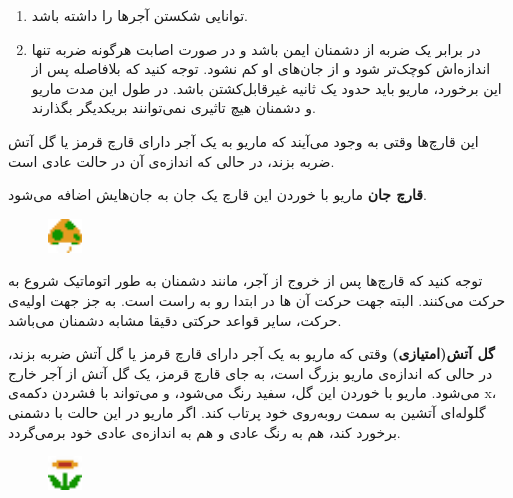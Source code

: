 \documentclass{utap}
\begin{document}
\begin{itemize}
		\begin{enumerate}
			\item
توانایی شکستن آجر‌ها را داشته باشد.
			\item
در برابر یک ضربه از دشمنان ایمن باشد و در صورت اصابت هرگونه ضربه تنها اندازه‌اش کوچک‌تر شود و از جان‌های او کم نشود. توجه کنید که بلافاصله پس از این برخورد، ماریو باید حدود یک ثانیه غیرقابل‌کشتن باشد. در طول این مدت ماریو و دشمنان هیچ تاثیری نمی‌توانند بر‌یکدیگر بگذارند.
		\end{enumerate}
		این قارچ‌ها وقتی به وجود می‌آیند که ماریو به یک آجر دارای قارچ قرمز یا گل آتش ضربه بزند، در حالی که اندازه‌ی آن در حالت عادی است.
		\newline
	\begin{minipage}{.75\textwidth}
		\item
\textbf{قارچ جان}
ماریو با خوردن این قارچ یک جان به جان‌هایش اضافه می‌شود.
\end{minipage}
\begin{minipage}{.15\textwidth}
\begin{figure}[H]
	\begin{center}
		\includegraphics[width=0.9cm]{health}
	\end{center}
\end{figure}
\end{minipage}

توجه کنید که قارچ‌ها پس از خروج از آجر، مانند دشمنان به طور اتوماتیک شروع به حرکت می‌کنند. البته جهت حرکت آن ها در ابتدا رو به راست است. به جز جهت اولیه‌ی حرکت، سایر قواعد حرکتی دقیقا مشابه دشمنان می‌باشد.\newline
	
	\begin{minipage}{.75\textwidth}
		\item
		\textbf{گل آتش(امتیازی)}
		وقتی که ماریو به یک آجر دارای قارچ قرمز یا گل آتش ضربه بزند، در حالی که اندازه‌ی ماریو بزرگ است، به جای قارچ قرمز، یک گل آتش از آجر خارج می‌شود. ماریو با خوردن این گل، سفید رنگ می‌شود، و می‌تواند با فشردن دکمه‌ی x، گلوله‌ای آتشین به سمت روبه‌روی خود پرتاب کند. اگر ماریو در این حالت با دشمنی برخورد کند، هم به رنگ عادی و هم به اندازه‌ی عادی خود برمی‌گردد.
	\end{minipage}
	\begin{minipage}{.15\textwidth}
		\begin{figure}[H]
			\begin{center}
				\includegraphics[width=0.9cm]{flower}
			\end{center}
		\end{figure}
	\end{minipage}
	

	\end{itemize}
\end{document}

